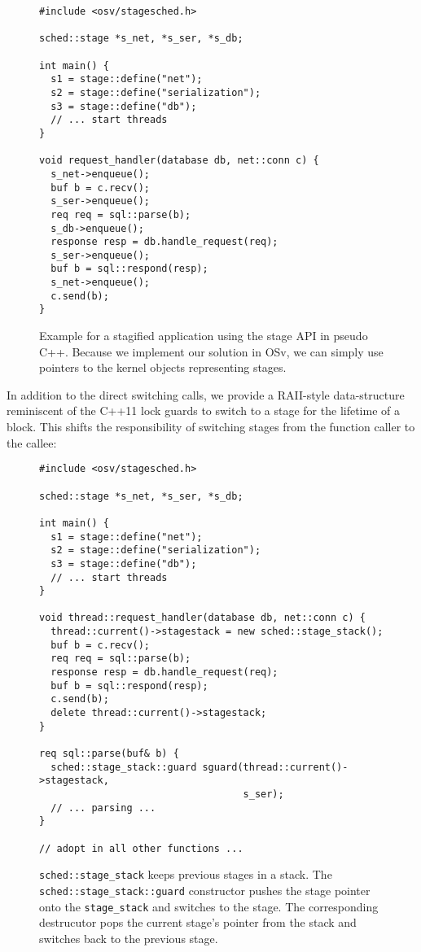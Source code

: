 \documentclass[12pt,a4paper]{book}
\begin{document}
\begin{figure}[h]
\begin{lstlisting}[style=figurecpp]
#include <osv/stagesched.h>

sched::stage *s_net, *s_ser, *s_db;

int main() {
  s1 = stage::define("net");
  s2 = stage::define("serialization");
  s3 = stage::define("db");
  // ... start threads
}

void request_handler(database db, net::conn c) {
  s_net->enqueue();
  buf b = c.recv();
  s_ser->enqueue();
  req req = sql::parse(b);
  s_db->enqueue();
  response resp = db.handle_request(req);
  s_ser->enqueue();
  buf b = sql::respond(resp);
  s_net->enqueue();
  c.send(b);
}
\end{lstlisting}
\caption{Example for a stagified application using the stage API in pseudo C++. Because we implement our solution in OSv, we can simply use pointers to the kernel objects representing stages.}
\label{fig:di:api:exampleraw}
\end{figure}

In addition to the direct switching calls, we provide a RAII-style data-structure reminiscent of the C++11 lock guards to switch to a stage for the lifetime of a block.
This shifts the responsibility of switching stages from the function caller to the callee:

\begin{figure}[h]
\begin{lstlisting}[style=figurecpp]
#include <osv/stagesched.h>

sched::stage *s_net, *s_ser, *s_db;

int main() {
  s1 = stage::define("net");
  s2 = stage::define("serialization");
  s3 = stage::define("db");
  // ... start threads
}

void thread::request_handler(database db, net::conn c) {
  thread::current()->stagestack = new sched::stage_stack();
  buf b = c.recv();
  req req = sql::parse(b);
  response resp = db.handle_request(req);
  buf b = sql::respond(resp);
  c.send(b);
  delete thread::current()->stagestack;
}

req sql::parse(buf& b) {
  sched::stage_stack::guard sguard(thread::current()->stagestack,
                                   s_ser);
  // ... parsing ...
}

// adopt in all other functions ...

\end{lstlisting}
\caption{\lstinline[style=figurecpp]{sched::stage_stack} keeps previous stages in a stack.
    The \lstinline[style=figurecpp]{sched::stage_stack::guard} constructor pushes the stage pointer onto the \lstinline[style=figurecpp]{stage_stack} and switches to the stage.
    The corresponding destrucutor pops the current stage's pointer from the stack and switches back to the previous stage.}
\end{figure}
\end{document}
